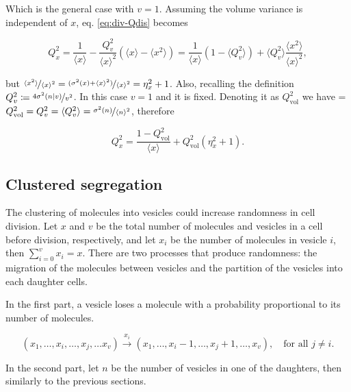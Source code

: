 Which is the general case with $v=1$. Assuming the volume variance is independent of $x$, eq. \eqref{eq:div-Qdis} becomes

\begin{equation}
  Q_x^2 = \frac{1}{\langle x\rangle} - \frac{Q_v^2}{\langle x\rangle^2}\left(\langle x\rangle  - \langle x^2\rangle\right) = \frac{1}{\langle x\rangle}\left(1-\langle Q_v^2\rangle\right) + \langle Q_v^2\rangle\frac{\langle x^2\rangle}{\langle x\rangle^2},
\end{equation}

but $\nicefrac{\langle x^2\rangle}{\langle x\rangle^2} = \nicefrac{(\sigma^2(x) + \langle x\rangle^2)}{\langle x\rangle^2} = \eta_x^2 + 1$. Also, recalling the definition  $Q_v^2 \coloneqq \nicefrac{4\sigma^2(n|v)}{v^2}$. In this case $v=1$ and it is fixed. Denoting it as $Q^2_\text{vol}$ we have = $Q^2_\text{vol} = Q_v^2 = \langle Q_v^2\rangle = \nicefrac{\sigma^2(n)}{\langle n\rangle^2}$, therefore

\begin{equation}
  \boxed{Q_x^2 = \frac{1-Q_\text{vol}^2}{\langle x\rangle} + Q_\text{vol}^2(\eta^2_x+1)}.
\end{equation}


\subsection{Clustered segregation}

The clustering of molecules into vesicles could increase randomness in cell division. Let $x$ and $v$ be the total number of molecules and vesicles in a cell before division, respectively, and let $x_i$ be the number of molecules in vesicle $i$, then $\sum_{i=0}^vx_i=x$. There are two processes that produce randomness: the migration of the molecules between vesicles and the partition of the vesicles into each daughter cells.

In the first part, a vesicle loses a molecule with a probability proportional to its number of molecules.

\begin{equation}
  \label{eq:div-vesicle_switch}
  (x_1,\dotsc,x_i,\dotsc,x_j,\dotsc x_v) \xrightarrow{x_i} (x_1,\dotsc,x_i-1,\dotsc,x_j+1,\dotsc, x_v),\quad \text{for all } j\neq i.
\end{equation}

In the second part, let $n$ be the number of vesicles in one of the daughters, then similarly to the previous sections.

